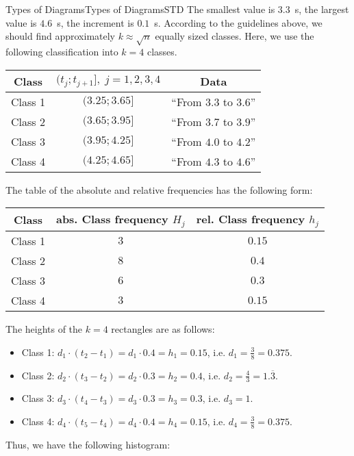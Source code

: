 \begin{MXContent}{Types of Diagrams}{Types of Diagrams}{STD}
The smallest value is $3.3$~s, the largest value is $4.6$~s, the increment is $0.1$~s. According to the guidelines above, 
we should find approximately $k\approx \sqrt{n}$ equally sized classes. Here, we use the following
classification into $k=4$ classes.


\begin{center}
\begin{tabular}{|c|c|c|}
\hline
Class & $(t_{j};t_{j+1}],\;j=1,2,3,4$ & Data \\ \hline
Class 1 & $(3.25;3.65]$ &  ``From $3.3$ to $3.6$'' \\ \hline
Class 2 & $(3.65;3.95]$ &  ``From $3.7$ to $3.9$'' \\ \hline
Class 3 & $(3.95;4.25]$ &  ``From $4.0$ to $4.2$'' \\ \hline
Class 4 & $(4.25;4.65]$ &  ``From $4.3$ to $4.6$'' \\ \hline
\end{tabular}
\end{center}

The table of the absolute and relative frequencies has the following form:

\begin{center}
\begin{tabular}{|c|c|c|}
\hline
Class & abs. Class frequency $H_{j}$ & rel. Class frequency $h_{j}$ \\ \hline
Class 1 & $3$ & $0.15$ \\ \hline
Class 2 & $8$ & $0.4$ \\ \hline
Class 3 & $6$ & $0.3$ \\ \hline
Class 4 & $3$ & $0.15$ \\ \hline
\end{tabular}
\end{center}

The heights of the $k=4$ rectangles are as follows:
\begin{itemize}
\item{Class 1: $d_{1}\cdot(t_{2}-t_{1})=d_{1}\cdot 0.4=h_{1}=0.15$, i.e. $d_{1}=\frac{3}{8}=0.375$.}
\item{Class 2: $d_{2}\cdot(t_{3}-t_{2})=d_{2}\cdot 0.3=h_{2}=0.4$, i.e. $d_{2}=\frac{4}{3}=1.\overline{3}$.}
\item{Class 3: $d_{3}\cdot(t_{4}-t_{3})=d_{3}\cdot 0.3=h_{3}=0.3$, i.e. $d_{3}=1$.}
\item{Class 4: $d_{4}\cdot(t_{5}-t_{4})=d_{4}\cdot 0.4=h_{4}=0.15$, i.e. $d_{4}=\frac{3}{8}=0.375$.}
\end{itemize}

Thus, we have the following histogram:

\begin{center}
\end{center}

\end{MXContent}

